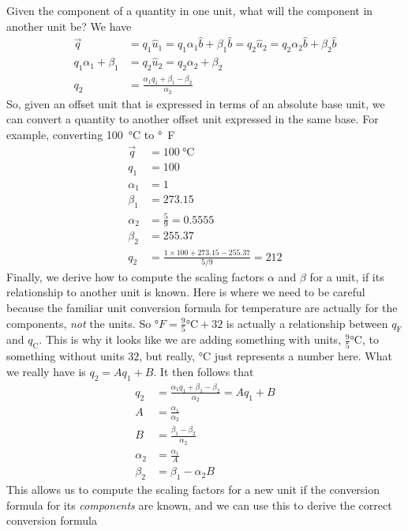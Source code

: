 \documentclass[letterpaper,10pt]{article}
\begin{document}
Given the component of a quantity in one unit, what will the component in another unit be? We have
\begin{align}
        \vec{q} &= q_1 \hat{u}_1 = q_1 \alpha_1 \hat{b} + \beta_1 \hat{b} = q_2 \hat{u}_2 = q_2 \alpha_2 \hat{b} + \beta_2 \hat{b} \\
        q_1 \alpha_1 + \beta_1 &= q_2 \hat{u}_2 = q_2 \alpha_2  + \beta_2 \\
        q_2 &= \frac{\alpha_1 q_1 + \beta_1 - \beta_2}{\alpha_2}
\end{align}
So, given an offset unit that is expressed in terms of an absolute base unit, we can convert a quantity to another offset unit expressed in the same base.
For example,
converting \SI{100}{\celsius} to \si{\degree F}
\begin{align}
        \vec{q} &= \SI{100}{\celsius} \\
        q_1 &= 100 \\
        \alpha_1  &= 1 \\
        \beta_1 &= 273.15 \\
        \alpha_2 &= \frac{5}{9} = 0.5555 \\
        \beta_2 &= 255.37 \\
        q_2 &= \frac{ 1\times 100 + 273.15 - 255.37}{5/9} = 212
\end{align}
Finally, we derive how to compute the scaling factors $\alpha$ and $\beta$ for a unit, if its relationship to another unit is known. Here is where we need to be careful because
the familiar unit conversion formula for temperature are actually for the components, \emph{not} the units. So $\si{\degree F} = \frac{9}{5} \si{\celsius} + 32$ is actually
a relationship between $q_\text{F}$ and $q_\text{C}$. This is why it looks like we are adding something with units, $\frac{9}{5} \si{\celsius}$, to something without units $32$,
but really, $\si{\celsius}$ just represents a number here. What we really have is $q_2 = Aq_1 + B$. It then follows that
\begin{align}
        q_2 &= \frac{\alpha_1 q_1 + \beta_1 - \beta_2}{\alpha_2} = Aq_1 + B \\
A &= \frac{\alpha_1}{\alpha_2} \\
B &= \frac{\beta_1 - \beta_2}{\alpha_2} \\
\alpha_2 &= \frac{\alpha_1}{A} \\
\beta_2 &= \beta_1 - \alpha_2 B
\end{align}
This allows us to compute the scaling factors for a new unit if the conversion formula for its \emph{components} are known, and we can use this to derive the correct conversion formula
\end{document}
